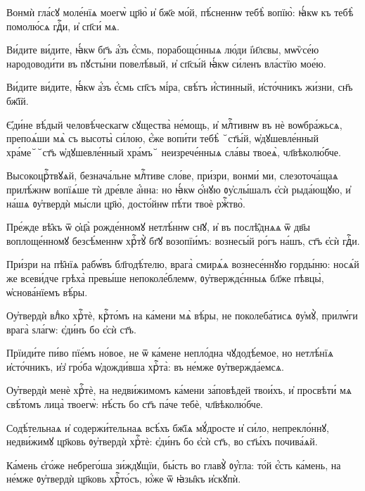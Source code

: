 \hKv Вонмѝ гла́сꙋ моле́нїѧ моегѡ̀ цр҃ю̀ и҆ бж҃е мо́й, пѣ́сненнѡ  тебѣ̀ вопїю̀: ꙗ҆́кѡ къ тебѣ̀ помолю́сѧ гдⷭ҇и, и҆ сп҃си́ мѧ. 

\hKv Ви́дите ви́дите, ꙗ҆́кѡ бг҃ъ а҆́зъ є҆́смь, порабощє́нныѧ лю́ди  і҆и҃лєвы, мѡѷсе́ю народоводи́ти въ пꙋсты́ни повелѣ́вый, и҆ сп҃сы́й  ꙗ҆́кѡ си́ленъ вла́стїю мое́ю. 

\hKv Ви́дите ви́дите, ꙗ҆́кѡ а҆́зъ є҆́смь сп҃съ мі́ра, свѣ́тъ  и҆́стинный, и҆сто́чникъ жи́зни, сн҃ъ бж҃їй. 
%

\hKv Є҆ди́не вѣ́дый человѣ́ческагѡ сꙋщества̀ не́мощь, и҆ млⷭ҇тивнѡ  въ нѐ воѡбра́жьсѧ, препоѧ́ши мѧ̀ съ высоты̀ си́лою, є҆́же вопи́ти   тебѣ̀ ꙾ст҃ы́й, ѡ҆дꙋшевле́нный  хра́ме꙾꙾ст҃ъ ѡ҆дꙋшевле́нный хра́мъ꙾ неизрече́нныѧ сла́вы твоеѧ̀,  чл҃вѣколю́бче. 

\hKv Высокоцрⷭ҇твꙋѧй, безнача́льне млⷭ҇тиве сло́ве, при́зри, вонми́  ми, слезоточа́щаѧ прилѣ́жнѡ вопїѧ́ше тѝ дре́вле а҆́нна: но ꙗ҆́кѡ  ѻ҆́нꙋю ᲂу҆слы́шалъ є҆сѝ рыда́ющꙋю, и҆ на́шѧ ᲂу҆твердѝ мы́сли  цр҃ю̀, досто́йнѡ пѣ́ти твоѐ ржⷭ҇тво̀. 
%

\hKv Пре́жде вѣ̑къ ѿ ѻ҆ц҃а̀ рожде́нномꙋ  нетлѣ́ннѡ сн҃ꙋ, и҆ въ послѣ̑днѧѧ ѿ дв҃ы воплоще́нномꙋ  безсѣ́меннѡ хрⷭ҇тꙋ̀ бг҃ꙋ возопїи́мъ: вознесы́й ро́гъ на́шъ, ст҃ъ  є҆сѝ гдⷭ҇и. 

\hKv При́зри на пѣ̑нїѧ рабѡ́въ бл҃годѣ́телю, врага̀ смирѧ́ѧ  вознесе́ннꙋю горды́ню: носѧ́й же всеви́дче грѣха̀ превы́ше  непоколе́блемѡ, ᲂу҆тверждє́нныѧ бл҃же пѣвцы̀, ѡ҆снова́нїемъ вѣ́ры. 
%

\hKv Оу҆твердѝ влⷣко хрⷭ҇тѐ, крⷭ҇то́мъ на  ка́мени мѧ̀ вѣ́ры, не поколеба́тисѧ ᲂу҆мꙋ̀, прилѡ́ги врага̀ ѕла́гѡ:  є҆ди́нъ бо є҆сѝ ст҃ъ.  
%

\hKv Прїиди́те пи́во пїе́мъ но́вое, не ѿ ка́мене непло́дна  чꙋдодѣ́емое, но нетлѣ́нїѧ и҆сто́чникъ, и҆з̾ гро́ба ѡ҆дожди́вша  хрⷭ҇та̀: въ не́мже ᲂу҆твержда́емсѧ. 
%
%

\hKv Оу҆твердѝ менѐ хрⷭ҇тѐ, на недви́жимомъ ка́мени  за́повѣдей твои́хъ, и҆ просвѣти́ мѧ свѣ́томъ лица̀ твоегѡ̀:  нѣ́сть бо ст҃ъ па́че тебѐ, чл҃вѣколю́бче. 
%
%

\hKv Содѣ́тельнаѧ и҆ содержи́тельнаѧ всѣ́хъ  бж҃їѧ мꙋ́дросте и҆ си́ло, непрекло́ннꙋ, недви́жимꙋ цр҃ковь  ᲂу҆твердѝ хрⷭ҇тѐ: є҆ди́нъ бо є҆сѝ ст҃ъ, во ст҃ы́хъ почива́ѧй. 
%

\hKv Ка́мень є҆го́же небрего́ша зи́ждꙋщїи, бы́сть во главꙋ̀ ᲂу҆́гла:  то́й є҆́сть ка́мень, на не́мже ᲂу҆твердѝ цр҃ковь хрⷭ҇то́съ, ю҆́же  ѿ ꙗ҆зы̑къ и҆скꙋпѝ. 

